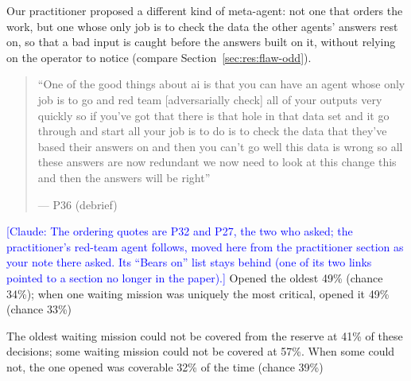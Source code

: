 \label{sec:qual:practitioner:pt-red-team}
{\color{blue}Our practitioner proposed a different kind of meta-agent: not one that orders the work, but one whose only job is to check the data the other agents' answers rest on, so that a bad input is caught before the answers built on it, without relying on the operator to notice (compare Section~\ref{sec:res:flaw-odd}).}

\begin{quote}\small
``One of the good things about ai is that you can have an agent whose only job is to go and red team [adversarially check] all of your outputs very quickly so if you've got that there is that hole in that data set and it go through and start all your job is to do is to check the data that they've based their answers on and then you can't go well this data is wrong so all these answers are now redundant we now need to look at this change this and then the answers will be right''\par\hfill--- P36 (debrief)
\end{quote}

\textcolor{blue}{[Claude: The ordering quotes are P32 and P27, the two who asked; the practitioner's red-team agent follows, moved here from the practitioner section as your note there asked. Its ``Bears on'' list stays behind (one of its two links pointed to a section no longer in the paper).]}
Opened the oldest 49\% (chance 34\%); when one waiting mission was uniquely the most critical, opened it 49\% (chance 33\%)

The oldest waiting mission could not be covered from the reserve at 41\% of these decisions; some waiting mission could not be covered at 57\%. When some could not, the one opened was coverable 32\% of the time (chance 39\%)


\clearpage
